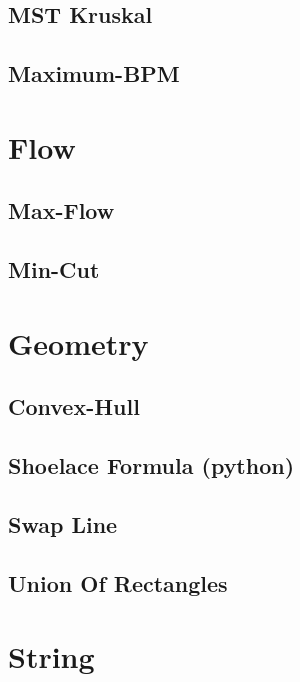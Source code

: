 \documentclass[8pt,twocolumn, landscape, a4paper]{report}
\begin{document}
\subsection{MST Kruskal}


\subsection{Maximum-BPM}


\section{Flow}

\subsection{Max-Flow}


\subsection{Min-Cut}



\section{Geometry}

\subsection{Convex-Hull}


\subsection{Shoelace Formula (python)}


\subsection{Swap Line}


\subsection{Union Of Rectangles}


\section{String}
\end{document}
